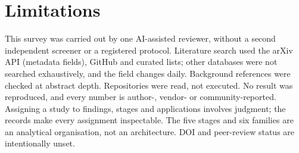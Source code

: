 \section{Limitations}\label{sec:limitations}

This survey was carried out by one AI-assisted reviewer, without a second independent screener or a registered protocol. Literature search used the arXiv API (metadata fields), GitHub and curated lists; other databases were not searched exhaustively, and the field changes daily. Background references were checked at abstract depth. Repositories were read, not executed. No result was reproduced, and every number is author-, vendor- or community-reported. Assigning a study to findings, stages and applications involves judgment; the records make every assignment inspectable. The five stages and six families are an analytical organisation, not an architecture. DOI and peer-review status are intentionally unset.
